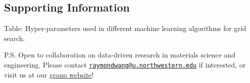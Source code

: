 \documentclass[11pt]{article}
\begin{document}
    \hypertarget{supporting-information}{%
\subsection{Supporting Information}\label{supporting-information}}

    Table: Hyper-parameters used in different machine learning algorithms
for grid search.

    

    

    P.S. Open to collaboration on data-driven research in materials science
and engineering. Please contact
\href{mailto:raymondwang@u.northwestern.edu}{\nolinkurl{raymondwang@u.northwestern.edu}}
if interested, or visit us at our
\href{https://mtd.mccormick.northwestern.edu/research/}{group website}!


    
    
    
    
\end{document}
